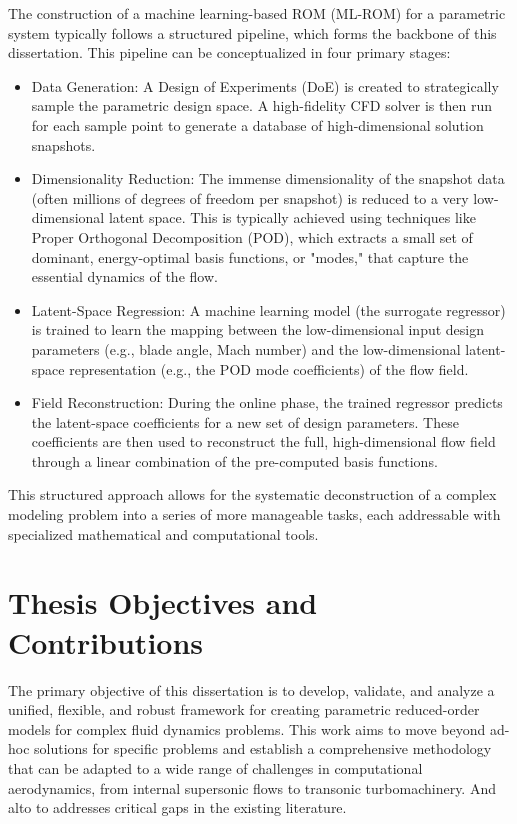 \documentclass[dsc, EN]{ufabcFHZh}
\begin{document}
{The construction of a machine learning-based ROM (ML-ROM) for a parametric system typically follows a structured pipeline, which forms the backbone of this dissertation. This pipeline can be conceptualized in four primary stages:

\begin{itemize}
    \item Data Generation: A Design of Experiments (DoE) is created to strategically sample the parametric design space. A high-fidelity CFD solver is then run for each sample point to generate a database of high-dimensional solution snapshots.
    
    \item Dimensionality Reduction: The immense dimensionality of the snapshot data (often millions of degrees of freedom per snapshot) is reduced to a very low-dimensional latent space. This is typically achieved using techniques like Proper Orthogonal Decomposition (POD), which extracts a small set of dominant, energy-optimal basis functions, or "modes," that capture the essential dynamics of the flow.

    \item Latent-Space Regression: A machine learning model (the surrogate regressor) is trained to learn the mapping between the low-dimensional input design parameters (e.g., blade angle, Mach number) and the low-dimensional latent-space representation (e.g., the POD mode coefficients) of the flow field.

    \item Field Reconstruction: During the online phase, the trained regressor predicts the latent-space coefficients for a new set of design parameters. These coefficients are then used to reconstruct the full, high-dimensional flow field through a linear combination of the pre-computed basis functions.
\end{itemize}

This structured approach allows for the systematic deconstruction of a complex modeling problem into a series of more manageable tasks, each addressable with specialized mathematical and computational tools.

\section{Thesis Objectives and Contributions}

The primary objective of this dissertation is to develop, validate, and analyze a unified, flexible, and robust framework for creating parametric reduced-order models for complex fluid dynamics problems. This work aims to move beyond ad-hoc solutions for specific problems and establish a comprehensive methodology that can be adapted to a wide range of challenges in computational aerodynamics, from internal supersonic flows to transonic turbomachinery. And alto to addresses critical gaps in the existing literature. 

}
\end{document}
